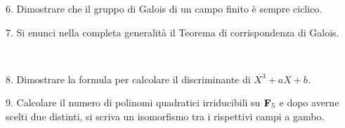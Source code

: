 \item{6.} Dimostrare che il gruppo di Galois di un campo finito \`{e} sempre ciclico.

\vv \item{7.} Si enunci nella completa generalit\`a il Teorema di
corrispondenza di Galois.

\ve\ \vs


\item{8.} Dimostrare la formula per calcolare il discriminante di $X^3+aX+b$.

\vv

\item{9.} Calcolare il numero di polinomi quadratici irriducibili su ${\bf F}_5$ e dopo averne scelti due distinti, si scriva un
isomorfismo tra i rispettivi campi a gambo.

\ \vst
 \bye
